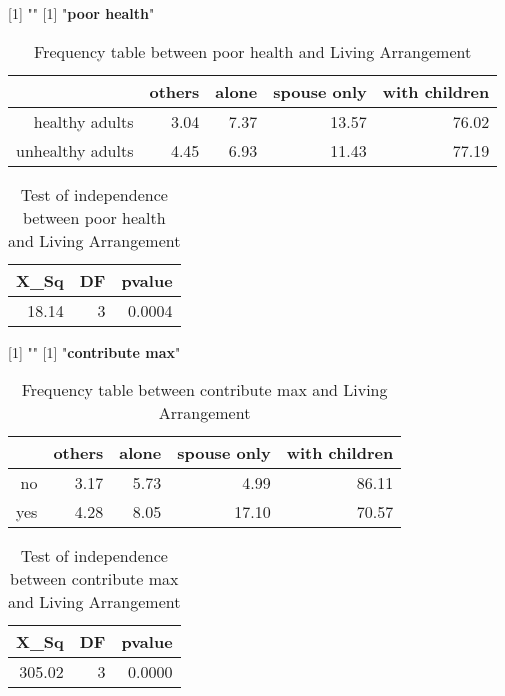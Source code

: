 \documentclass[11pt]{article}
\begin{document}
[1] "\newline"
[1] "{\bf{poor health}}"
\begin{table}[H]
\centering
\begin{tabular}{rrrrr}
  \hline
 & others & alone & spouse only & with children \\ 
  \hline
healthy adults & 3.04 & 7.37 & 13.57 & 76.02 \\ 
  unhealthy adults & 4.45 & 6.93 & 11.43 & 77.19 \\ 
   \hline
\end{tabular}
\caption{Frequency table between poor health and Living Arrangement} 
\end{table}
\begin{table}[H]
\centering
\begin{tabular}{rrr}
  \hline
X\_Sq & DF & pvalue \\ 
  \hline
18.14 & 3 & 0.0004 \\ 
   \hline
\end{tabular}
\caption{Test of independence between poor health and Living Arrangement} 
\end{table}
[1] "\newline"
[1] "{\bf{contribute max}}"
\begin{table}[H]
\centering
\begin{tabular}{rrrrr}
  \hline
 & others & alone & spouse only & with children \\ 
  \hline
no & 3.17 & 5.73 & 4.99 & 86.11 \\ 
  yes & 4.28 & 8.05 & 17.10 & 70.57 \\ 
   \hline
\end{tabular}
\caption{Frequency table between contribute max and Living Arrangement} 
\end{table}
\begin{table}[H]
\centering
\begin{tabular}{rrr}
  \hline
X\_Sq & DF & pvalue \\ 
  \hline
305.02 & 3 & 0.0000 \\ 
   \hline
\end{tabular}
\caption{Test of independence between contribute max and Living Arrangement} 
\end{table}
\end{document}
